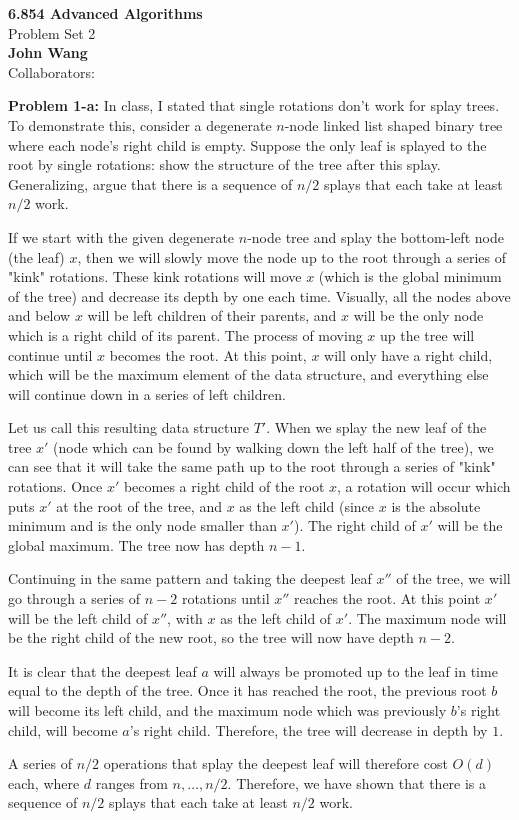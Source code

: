 \documentclass[psamsfonts]{amsart}
\newenvironment{sol}{\vspace{0.25cm}{\large \bfseries Solution:}}{\qedsymbol}
\newenvironment{prob}[1]{\begin{framed}{\large \bfseries Problem #1:}}{\end{framed}}
\newcommand{\makenewtitle}{
\begin{center}
{\huge \bfseries 6.854 Advanced Algorithms} \\
Problem Set 2\\
\vspace{0.25cm}
{\bfseries John Wang} \\
Collaborators:
\end{center}
\vspace{0.5cm}
}
\begin{document}
\makenewtitle
\begin{prob}{1-a}
In class, I stated that single rotations don't work for splay trees. To demonstrate this, consider a degenerate $n$-node linked list shaped binary tree where each node's right child is empty. Suppose the only leaf is splayed to the root by single rotations: show the structure of the tree after this splay. Generalizing, argue that there is a sequence of $n/2$ splays that each take at least $n/2$ work.
\end{prob}

\begin{sol}
If we start with the given degenerate $n$-node tree and splay the bottom-left node (the leaf) $x$, then we will slowly move the node up to the root through a series of "kink" rotations. These kink rotations will move $x$ (which is the global minimum of the tree) and decrease its depth by one each time. Visually, all the nodes above and below $x$ will be left children of their parents, and $x$ will be the only node which is a right child of its parent. The process of moving $x$ up the tree will continue until $x$ becomes the root. At this point, $x$ will only have a right child, which will be the maximum element of the data structure, and everything else will continue down in a series of left children.

Let us call this resulting data structure $T'$. When we splay the new leaf of the tree $x'$ (node which can be found by walking down the left half of the tree), we can see that it will take the same path up to the root through a series of "kink" rotations. Once $x'$ becomes a right child of the root $x$, a rotation will occur which puts $x'$ at the root of the tree, and $x$ as the left child (since $x$ is the absolute minimum and is the only node smaller than $x'$). The right child of $x'$ will be the global maximum. The tree now has depth $n-1$.

Continuing in the same pattern and taking the deepest leaf $x''$ of the tree, we will go through a series of $n-2$ rotations until $x''$ reaches the root. At this point $x'$ will be the left child of $x''$, with $x$ as the left child of $x'$. The maximum node will be the right child of the new root, so the tree will now have depth $n-2$. 

It is clear that the deepest leaf $a$ will always be promoted up to the leaf in time equal to the depth of the tree. Once it has reached the root, the previous root $b$ will become its left child, and the maximum node which was previously $b$'s right child, will become $a$'s right child. Therefore, the tree will decrease in depth by $1$. 

A series of $n/2$ operations that splay the deepest leaf will therefore cost $O(d)$ each, where $d$ ranges from $n, \ldots, n/2$. Therefore, we have shown that there is a sequence of $n/2$ splays that each take at least $n/2$ work.
\end{sol}
\end{document}
